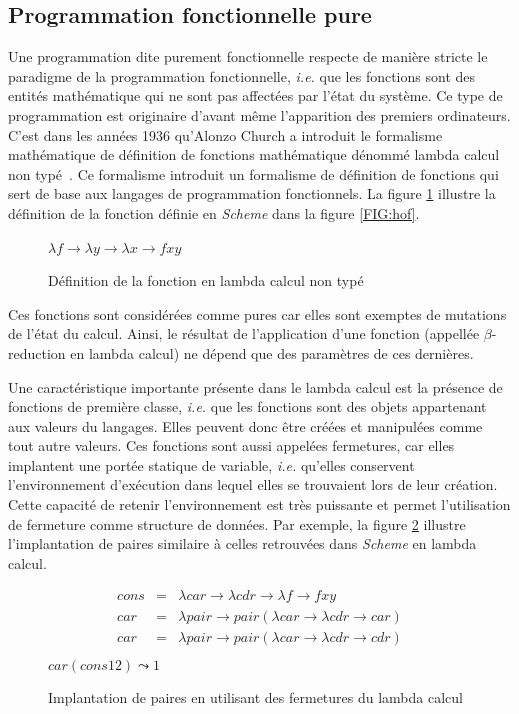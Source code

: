 \documentclass[12pt,twoside,letterpaper,francais]{book}
\newcommand{\ie}{{\textit{i.e. }}}
\newcommand{\Schemelang}{{\textit{Scheme }}}
\newcommand{\scheme}[1]{\selectlanguage{english}{\tt #1}\selectlanguage{french}}
\begin{document}
\FloatBarrier
\subsection{Programmation fonctionnelle pure}
Une programmation dite purement fonctionnelle respecte de manière
stricte le paradigme de la programmation fonctionnelle, \ie que les
fonctions sont des entités mathématique qui ne sont pas affectées par
l'état du système. Ce type de programmation est originaire d'avant
même l'apparition des premiers ordinateurs. C'est dans les années 1936
qu'Alonzo Church a introduit le formalisme mathématique de définition
de fonctions mathématique dénommé lambda calcul non
typé~\cite{LAMBDA_CALCULUS}. Ce formalisme introduit un formalisme de
définition de fonctions qui sert de base aux langages de programmation
fonctionnels. La figure \ref{FIG:lambda-calcul} illustre la définition
de la fonction \scheme{flip} définie en \Schemelang dans la figure
\ref{FIG:hof}.

\begin{figure}[htb!]
  \center
  $\lambda f \rightarrow \lambda y \rightarrow \lambda x \rightarrow f x y$
  \caption{Définition de la fonction \scheme{flip} en lambda calcul
    non typé}
  \label{FIG:lambda-calcul}
\end{figure}

Ces fonctions sont considérées comme pures car elles sont exemptes de
mutations de l'état du calcul. Ainsi, le résultat de l'application
d'une fonction (appellée $\beta$-reduction en lambda calcul) ne dépend
que des paramètres de ces dernières.

Une caractéristique importante présente dans le lambda calcul est la
présence de fonctions de première classe, \ie que les fonctions sont
des objets appartenant aux valeurs du langages. Elles peuvent donc
être créées et manipulées comme tout autre valeurs. Ces fonctions sont
aussi appelées fermetures, car elles implantent une portée statique de
variable, \ie qu'elles conservent l'environnement d'exécution dans
lequel elles se trouvaient lors de leur création. Cette capacité de
retenir l'environnement est très puissante et permet l'utilisation de
fermeture comme structure de données. Par exemple, la figure
\ref{Scheme:lambda-pairs} illustre l'implantation de paires similaire
à celles retrouvées dans \Schemelang en lambda calcul.

\begin{figure}[htb]
  \center
  \begin{eqnarray*}
   cons &=& \lambda car \rightarrow \lambda cdr \rightarrow \lambda f \rightarrow f x y \\
   car &=& \lambda pair \rightarrow pair (\lambda car \rightarrow \lambda cdr \rightarrow car) \\
   car &=& \lambda pair \rightarrow pair (\lambda car \rightarrow \lambda cdr \rightarrow cdr) \\
  \end{eqnarray*}
  $car (cons 1 2) \leadsto 1$
  \caption{Implantation de paires en utilisant des fermetures du
    lambda calcul}
  \label{Scheme:lambda-pairs}
\end{figure}
\end{document}
